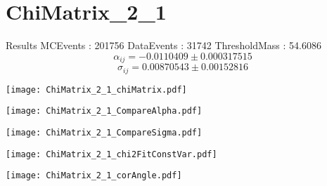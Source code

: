 \documentclass[a4paper,12pt]{article}
\begin{document}
\section{ChiMatrix\_2\_1}
\begin{minipage}{0.49\linewidth} Results \newline
MCEvents : 201756\newline
DataEvents : 31742 \newline
ThresholdMass : 54.6086\\
$$\alpha_{ij} = -0.0110409\pm 0.000317515$$
$$\sigma_{ij} = 0.00870543\pm 0.00152816$$
\end{minipage}\hfill
\begin{minipage}{0.49\linewidth} 
\texttt{[image: ChiMatrix\_2\_1\_chiMatrix.pdf]}\\
\end{minipage}
\hfill
\begin{minipage}{0.49\linewidth} 
\texttt{[image: ChiMatrix\_2\_1\_CompareAlpha.pdf]}\\
\end{minipage}
\hfill
\begin{minipage}{0.49\linewidth} 
\texttt{[image: ChiMatrix\_2\_1\_CompareSigma.pdf]}\\
\end{minipage}
\begin{minipage}{0.49\linewidth} 
\texttt{[image: ChiMatrix\_2\_1\_chi2FitConstVar.pdf]}\\
\end{minipage}
\hfill
\begin{minipage}{0.49\linewidth} 
\texttt{[image: ChiMatrix\_2\_1\_corAngle.pdf]}\\
\end{minipage}
\end{document}

